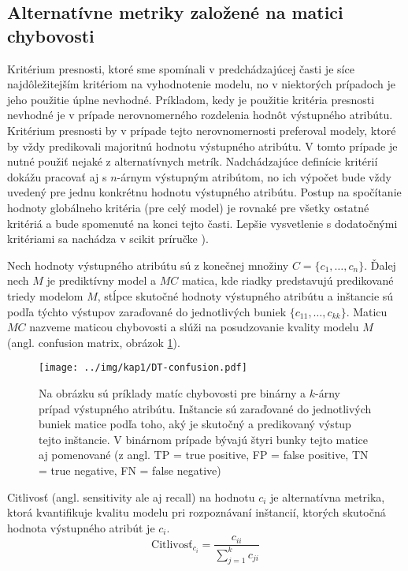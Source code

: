 \subsection{Alternatívne metriky založené na matici chybovosti}\label{kap1:2.6:2.6.2:Alternatives}
Kritérium presnosti, ktoré sme spomínali v predchádzajúcej časti je síce najdôležitejším kritériom na vyhodnotenie modelu, no v niektorých prípadoch je jeho použitie úplne nevhodné. Príkladom, kedy je použitie kritéria presnosti nevhodné je v prípade nerovnomerného rozdelenia hodnôt výstupného atribútu. Kritérium presnosti by v prípade tejto nerovnomernosti preferoval modely, ktoré by vždy predikovali majoritnú hodnotu výstupného atribútu. V tomto prípade je nutné použiť nejaké z alternatívnych metrík.  
Nadchádzajúce definície kritérií dokážu pracovať aj s $n$-árnym výstupným atribútom, no ich výpočet bude vždy uvedený pre jednu konkrétnu hodnotu výstupného atribútu. Postup na spočítanie hodnoty globálneho kritéria (pre celý model) je rovnaké pre všetky ostatné kritériá a bude spomenuté na konci tejto časti. Lepšie vysvetlenie s dodatočnými kritériami sa nachádza v scikit príručke \cite{online-NAryConfusion}).

\begin{def-sk}
Nech hodnoty výstupného atribútu sú z konečnej množiny $C = \{c_{1},\ldots,c_{n}\}$. Ďalej nech $M$ je prediktívny model a $MC$ matica, kde riadky predstavujú predikované triedy modelom $M$, stĺpce skutočné hodnoty výstupného atribútu a inštancie sú podľa týchto výstupov zaraďované do jednotlivých buniek $\{c_{11},\ldots,c_{kk}\}$. Maticu $MC$ nazveme maticou chybovosti a slúži na posudzovanie kvality modelu $M$ (angl. confusion matrix, obrázok \ref{fig:Confusion}).
\end{def-sk}

\begin{figure}[h]
\centering
\centerline{\mbox{\texttt{[image: ../img/kap1/DT-confusion.pdf]}}}
\caption{Na obrázku sú príklady matíc chybovosti pre binárny a $k$-árny prípad výstupného atribútu. Inštancie sú zaraďované do jednotlivých buniek matice podľa toho, aký je skutočný a predikovaný výstup tejto inštancie. V binárnom prípade bývajú štyri bunky tejto matice aj pomenované (z angl. TP = true positive, FP = false positive, TN = true negative, FN = false negative)}\label{fig:Confusion}
\end{figure}

\begin{def-sk}\label{kap1:2.6:2.6.2:Sensitivity}
Citlivosť (angl. sensitivity ale aj recall) na hodnotu $c_{i}$ je alternatívna metrika, ktorá kvantifikuje kvalitu modelu pri rozpoznávaní inštancií, ktorých skutočná hodnota výstupného atribút je $c_{i}$.
\begin{equation}
\mbox{Citlivosť}_{c_{i}} = \dfrac{c_{ii}}{\sum_{j=1}^{k} c_{ji}}
\end{equation}
\end{def-sk}


